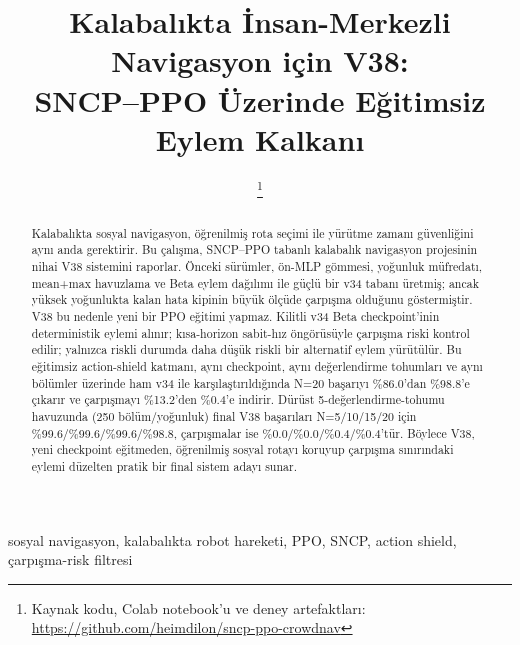 \documentclass[conference]{IEEEtran}
\begin{document}
\title{Kalabalıkta İnsan-Merkezli Navigasyon için V38:\\
SNCP--PPO Üzerinde Eğitimsiz Eylem Kalkanı}

\author{
\thanks{Kaynak kodu, Colab notebook'u ve deney artefaktları:
\url{https://github.com/heimdilon/sncp-ppo-crowdnav}}}

\maketitle

\begin{abstract}
Kalabalıkta sosyal navigasyon, öğrenilmiş rota seçimi ile yürütme zamanı güvenliğini aynı anda gerektirir.
Bu çalışma, SNCP--PPO tabanlı kalabalık navigasyon projesinin nihai V38 sistemini raporlar. Önceki sürümler,
ön-MLP gömmesi, yoğunluk müfredatı, mean+max havuzlama ve Beta eylem dağılımı ile güçlü bir v34 tabanı üretmiş;
ancak yüksek yoğunlukta kalan hata kipinin büyük ölçüde çarpışma olduğunu göstermiştir. V38 bu nedenle yeni
bir PPO eğitimi yapmaz. Kilitli v34 Beta checkpoint'inin deterministik eylemi alınır; kısa-horizon sabit-hız
öngörüsüyle çarpışma riski kontrol edilir; yalnızca riskli durumda daha düşük riskli bir alternatif eylem
yürütülür.
Bu eğitimsiz action-shield katmanı, aynı checkpoint, aynı değerlendirme tohumları ve aynı bölümler üzerinde
ham v34 ile karşılaştırıldığında N=20 başarıyı \%86.0'dan \%98.8'e çıkarır ve çarpışmayı \%13.2'den \%0.4'e
indirir. Dürüst 5-değerlendirme-tohumu havuzunda (250 bölüm/yoğunluk) final V38 başarıları N=5/10/15/20 için
\%99.6/\%99.6/\%99.6/\%98.8, çarpışmalar ise \%0.0/\%0.0/\%0.4/\%0.4'tür. Böylece V38, yeni checkpoint
eğitmeden, öğrenilmiş sosyal rotayı koruyup çarpışma sınırındaki eylemi düzelten pratik bir final sistem adayı
sunar.
\end{abstract}

\begin{IEEEkeywords}
sosyal navigasyon, kalabalıkta robot hareketi, PPO, SNCP, action shield, çarpışma-risk filtresi
\end{IEEEkeywords}

\end{document}
